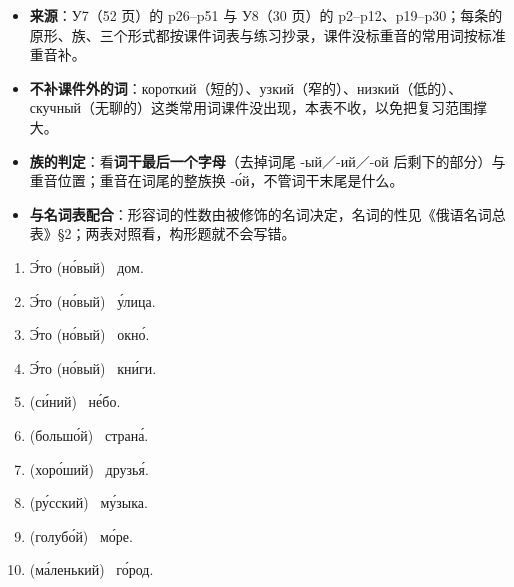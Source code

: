 \documentclass[11pt]{ctexart}
\newcommand{\blank}{\underline{\hspace{3.2em}}}
\begin{document}
\begin{itemize}
\item \textbf{来源}：У7（52 页）的 p26–p51 与 У8（30 页）的 p2–p12、p19–p30；每条的原形、族、三个形式都按课件词表与练习抄录，课件没标重音的常用词按标准重音补。
\item \textbf{不补课件外的词}：короткий（短的）、узкий（窄的）、низкий（低的）、скучный（无聊的）这类常用词课件没出现，本表不收，以免把复习范围撑大。
\item \textbf{族的判定}：看\textbf{词干最后一个字母}（去掉词尾 -ый／-ий／-ой 后剩下的部分）与重音位置；重音在词尾的整族换 -о́й，不管词干末尾是什么。
\item \textbf{与名词表配合}：形容词的性数由被修饰的名词决定，名词的性见《俄语名词总表》§2；两表对照看，构形题就不会写错。
\end{itemize}


\begin{enumerate}
\item Э́то (но́вый) \blank\ дом.
\item Э́то (но́вый) \blank\ у́лица.
\item Э́то (но́вый) \blank\ окно́.
\item Э́то (но́вый) \blank\ кни́ги.
\item (си́ний) \blank\ не́бо.
\item (большо́й) \blank\ страна́.
\item (хоро́ший) \blank\ друзья́.
\item (ру́сский) \blank\ му́зыка.
\item (голубо́й) \blank\ мо́ре.
\item (ма́ленький) \blank\ го́род.
\end{enumerate}

\end{document}
